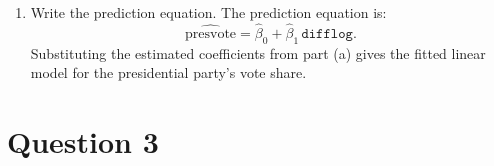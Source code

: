 \documentclass[12pt,letterpaper]{article}
\begin{document}
\begin{enumerate}
		 Residuals (\texttt{res\_q2}) capture the portion of \texttt{presvote} not explained by \texttt{difflog}. They will later be used in Question 4 to construct the added–variable regression.
		\vspace{0.3cm}
		
		\item Write the prediction equation. \vspace{0.3cm}
		The prediction equation is:
		\[
		\widehat{\text{presvote}} = \hat{\beta}_0 + \hat{\beta}_1\,\texttt{difflog}.
		\] 
		Substituting the estimated coefficients from part (a) gives the fitted linear model for the presidential party’s vote share.
		
		\end{enumerate}	
	
	\newpage	
\section*{Question 3}
\end{document}
